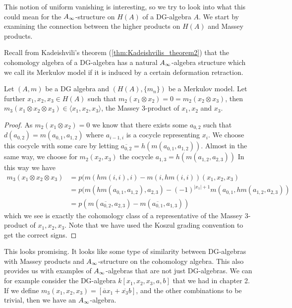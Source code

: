 
This notion of uniform vanishing is interesting, so we try to look into what this could mean for the $A_{\infty}$-structure on $H(A)$ of a DG-algebra $A$. We start by examining the connection between the higher products on $H(A)$ and Massey products. 

Recall from Kadeishvili's theorem (\cref{thm:Kadeishvilis_theorem2}) that the cohomology algebra of a DG-algebra has a natural $A_{\infty}$-algebra structure which we call its Merkulov model if it is induced by a certain deformation retraction.

\begin{lemma}
\label{lem:representing_3_massey}
Let $(A, m)$ be a DG algebra and $(H(A), \{m_n\})$ be a Merkulov model. Let further $x_1, x_2, x_3 \in H(A)$ such that $m_2(x_1\otimes x_2) = 0 = m_2(x_2\otimes x_3)$, then $m_3(x_1 \otimes x_2 \otimes x_3) \in \langle x_1, x_2, x_3 \rangle$, the Massey 3-product of $x_1, x_2$ and $x_3$.  
\end{lemma}
\begin{proof}
As $m_2(x_1 \otimes x_2) = 0$ we know that there exists some $a_{0,2}$ such that $d(a_{0,2}) = m(a_{0,1}, a_{1,2})$ where $a_{i-1, i}$ is a cocycle representing $x_i$. We choose this cocycle with some care by letting $\overline{a_{0,2}} = h(m(a_{0,1}, a_{1,2}))$. Almost in the same way, we choose for $m_2(x_2, x_3)$ the cocycle $a_{1,3} = h(m(a_{1,2}, a_{2,3}))$ In this way we have
\begin{align*}
    m_3(x_1\otimes x_2\otimes x_3) 
    &= p(m(hm(i, i), i)-m(i, hm(i,i))(x_1, x_2, x_3) \\
    &= p(m(hm(a_{0,1}, a_{1,2}), a_{2,3}) - (-1)^{|x_1|+1} m(a_{0,1}, hm(a_{1,2}, a_{2,3})) \\
    &= p(m(\overline{a_{0,2}}, a_{2,3})-m(\overline{a_{0,1}}, a_{1,3}))
\end{align*}
which we see is exactly the cohomology class of a representative of the Massey 3-product of $x_1, x_2, x_3$. Note that we have used the Koszul grading convention to get the correct signs. 
\end{proof}

This looks promising. It looks like some type of similarity between DG-algebras with Massey products and $A_{\infty}$-structure on the cohomology algebra. This also provides us with examples of $A_{\infty}$-algebras that are not just DG-algebras. We can for example consider the DG-algebra $k[x_1, x_2, x_3, a, b]$ that we had in chapter 2. If we define $m_3(x_1, x_2, x_3)=[\overline{a}x_1 + \overline{x_3}b]$, and the other combinations to be trivial, then we have an $A_{\infty}$-algebra.

